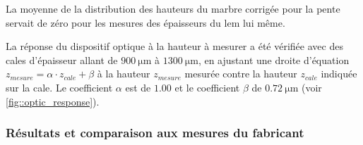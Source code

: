                     La moyenne de la distribution des hauteurs du marbre corrigée pour la pente servait de zéro pour les mesures des épaisseurs du \gls{lem} lui même.
                    
                    La réponse du dispositif optique à la hauteur à mesurer a été vérifiée avec des cales d'épaisseur allant de $\SI{900}{\micro\meter}$ à $\SI{1300}{\micro\meter}$, en ajustant une droite d'équation $z_{mesure} = \alpha \cdot z_{cale} + \beta$ à la hauteur $z_{mesure}$ mesurée contre la hauteur $z_{cale}$ indiquée sur la cale. Le coefficient $\alpha$ est de $1.00$ et le coefficient $\beta$ de $\SI{0.72}{\micro\meter}$ (voir \autoref{fig::optic_response}).
                    
                    
                    
            \subsubsection{Résultats et comparaison aux mesures du fabricant}
                    
